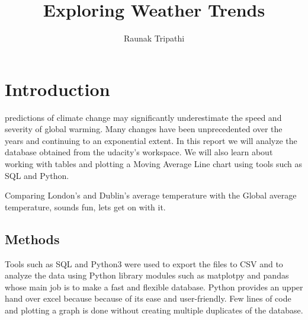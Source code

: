 \documentclass[10pt,journal,compsoc]{IEEEtran}
\begin{document}
\title{Exploring Weather Trends}

\author{Raunak Tripathi}

%
{}

\maketitle
\IEEEdisplaynontitleabstractindextext
\IEEEpeerreviewmaketitle
\section{Introduction}
\label{sec:introduction}

 predictions of climate change may significantly underestimate the speed and severity of global warming. Many changes have been unprecedented over the years and continuing to an exponential extent. In this report we will analyze the database obtained from the udacity's workspace. We will also learn about working with tables and plotting a Moving Average Line chart using tools such as SQL and Python. 

Comparing London's and Dublin's average temperature with the Global average temperature, sounds fun, lets get on with it.


\subsection{Methods}
Tools such as SQL and Python3 were used to export the files to CSV and to analyze the data using Python library modules such as matplotpy and pandas whose main job is to make a fast and flexible database. Python provides an upper hand over excel because because of its ease and user-friendly. Few lines of code and plotting a graph is done without creating multiple duplicates of the database.
\end{document}
